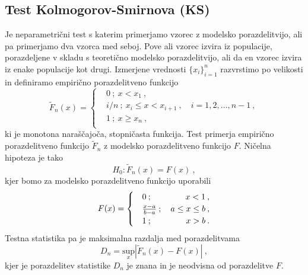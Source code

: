 \documentclass[11pt, oneside]{article}
\theoremstyle{definition}
\begin{document}
\subsection{Test Kolmogorov-Smirnova (KS)}
Je neparametrični test s katerim primerjamo vzorec z modelsko porazdelitvijo, ali pa primerjamo dva vzorca med seboj.
Pove ali vzorec izvira iz populacije, porazdeljene v skladu s teoretično modelsko porazdelitvijo, ali da en
vzorec izvira iz enake populacije kot drugi. Izmerjene vrednosti $\{ x_i \}_{i=1}^n$ razvrstimo po velikosti
in definiramo empirično porazdelitveno funkcijo
\begin{equation}
    \label{eq: KS_F}
    \widetilde{F}_n(x) =
    \begin{cases}
         & 0 \>;\> x < x_1 \>,                                           \\
         & i/n \>;\> x_i \leq x < x_{i+1} \>, \quad i=1,2,\ldots,n-1 \>, \\
         & 1 \>;\> x \geq x_n \>,                                        \\
    \end{cases}
\end{equation}
ki je monotona naraščajoča, stopničasta funkcija. Test primerja empirično porazdelitveno funkcijo $\widetilde{F}_n$
z modelsko porazdelitveno funkcijo $F$. Ničelna hipoteza je tako
\begin{equation}
    H_0: \widetilde{F}_n(x)=F(x) \>,
\end{equation}
kjer bomo za modelsko porazdelitveno funkcijo uporabili
\begin{equation}
    F(x) =
    \begin{cases}
         & 0 \>;\hfill x < 1 \>,                                   \\
         & \frac{x - a}{b - a} \>;\quad \hfill a \leq x \leq b \>, \\
         & 1 \>;\hfill x > b \>.                                   \\
    \end{cases}
\end{equation}
Testna statistika pa je maksimalna razdalja med porazdelitvama
\begin{equation}
    D_n = \underset{x}{\text{sup}} \left | \widetilde{F}_n(x) - F(x) \right | \>,
\end{equation}
kjer je porazdelitev statistike $D_n$ je znana in je neodvisna od porazdelitve $F$.

\newpage
\end{document}
